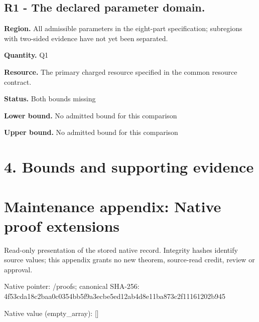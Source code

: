 \documentclass[10pt,a4paper]{article}
\begin{document}
\subsection{R1 - The declared parameter domain.}


\textbf{Region.} All admissible parameters in the eight-part specification; subregions with two-sided evidence have not yet been separated.



\textbf{Quantity.} Q1



\textbf{Resource.} The primary charged resource specified in the common resource contract.



\textbf{Status.} Both bounds missing



\textbf{Lower bound.} No admitted bound for this comparison



\textbf{Upper bound.} No admitted bound for this comparison



\section{4. Bounds and supporting evidence}


\section{Maintenance appendix: Native proof extensions}


Read-only presentation of the stored native record. Integrity hashes identify source values; this appendix grants no new theorem, source-read credit, review or approval.



Native pointer: /proofs; canonical SHA-256: 4f53cda18c2baa0c0354bb5f\allowbreak{}9a3ecbe5ed12ab4d8e11ba87\allowbreak{}3c2f11161202b945



Native value (empty\_array): []
\end{document}
